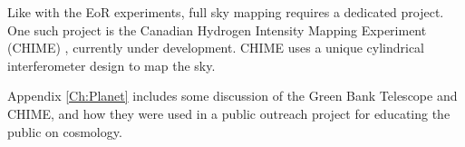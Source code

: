 Like with the EoR experiments, full sky mapping requires a dedicated project. One such project is the Canadian Hydrogen Intensity Mapping Experiment (CHIME) \cite{shaw_2014}\cite{chime}, currently under development. CHIME uses a unique cylindrical interferometer design to map the sky. 

Appendix \ref{Ch:Planet} includes some discussion of the Green Bank Telescope and CHIME, and how they were used in a public outreach project for educating the public on \cm cosmology. 

